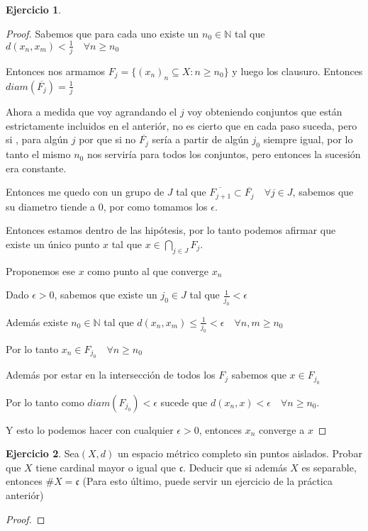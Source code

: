 \documentclass[11pt]{report}
\newcommand{\N}{\mathbb{N}}
\newcommand{\ol}{\overline}
\theoremstyle{definition}
\newtheorem{ej}{Ejercicio}
\begin{document}
\begin{ej}
\begin{proof}
			Sabemos que para cada uno existe un $n_0 \in \N $ tal que $d(x_n,x_m) < \frac{1}{j} \quad \forall n \geq n_0$

			Entonces nos armamos $F_j = \{(x_n)_n \subseteq X : n \geq n_0 \}$ y luego los clausuro. Entonces $diam(\ol{F_j}) = \frac{1}{j}$

			Ahora a medida que voy agrandando el $j$ voy obteniendo conjuntos que están estrictamente incluidos en el anteriór, no es cierto que en cada paso suceda, pero si , para algún $j$ por que si no $\ol{F_j}$ sería a partir de algún $j_0$ siempre igual, por lo tanto el mismo $n_0$ nos serviría para todos los conjuntos, pero entonces la sucesión era constante. 

			Entonces me quedo con un grupo de $J$ tal que $\ol{F_{j+1}} \subset \ol{F_{j}}\quad \forall j \in J$, sabemos que su diametro tiende a 0, por como tomamos los $\epsilon$.

			Entonces estamos dentro de las hipótesis, por lo tanto podemos afirmar que existe un único punto $x$ tal que $x \in \bigcap_{j \in J} F_j$. 
		
			Proponemos ese $x$ como punto al que converge $x_n$
	
			Dado $\epsilon >0$, sabemos que existe un $j_0 \in J$ tal que $\frac{1}{j_0} < \epsilon$ 

			Además existe $n_0 \in \N$ tal que $d(x_n,x_m) \leq \frac{1}{j_0} < \epsilon \quad \forall n,m \geq n_0$

			Por lo tanto $x_n \in F_{j_0} \quad \forall n \geq n_0$ 

			Además por estar en la intersección de todos los $F_j$ sabemos que $x \in F_{j_0}$

			Por lo tanto como $diam(F_{j_0}) < \epsilon$ sucede que $d(x_n,x) < \epsilon \quad \forall n\geq n_0$.

			Y esto lo podemos hacer con cualquier $\epsilon >0$, entonces $x_n$ converge a $x$
		\end{proof}	
	\end{ej}
	\begin{ej}
		Sea$(X,d)$ un espacio métrico completo sin puntos aislados. Probar que $X$ tiene cardinal mayor o igual que $\mathfrak{c}$. Deducir que si además $X$ es separable, entonces $\# X = \mathfrak{c}$ (Para esto último, puede servir un ejercicio de la práctica anteriór)

		\begin{proof}
			
		\end{proof}
		
	\end{ej}
\end{document}
